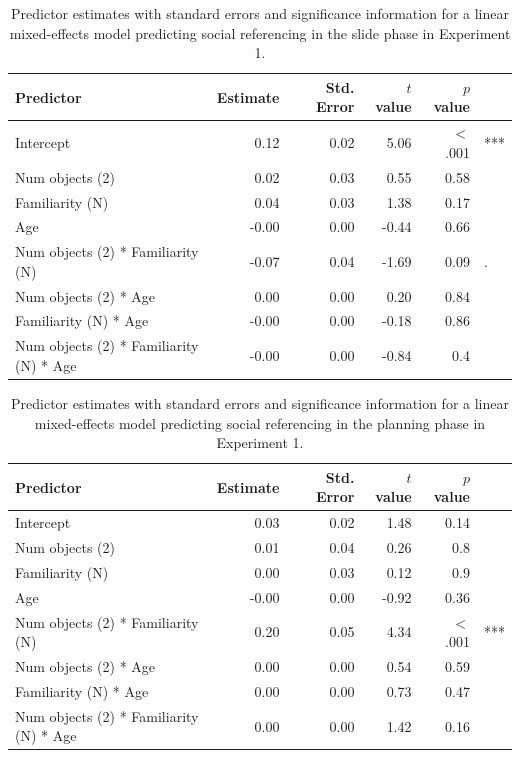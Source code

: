 \documentclass[a4paper,man,apacite,floatsintext]{apa6}
\begin{document}
\begin{table}[tb]
\centering
\begin{tabular}{lrrrrl}
 Predictor & Estimate & Std. Error & $t$ value & $p$ value &  \\ 
  \hline
Intercept & 0.12 & 0.02 & 5.06 & $<$ .001 & *** \\ 
  Num objects (2) & 0.02 & 0.03 & 0.55 & 0.58 &  \\ 
  Familiarity (N) & 0.04 & 0.03 & 1.38 & 0.17 &  \\ 
  Age & -0.00 & 0.00 & -0.44 & 0.66 &  \\ 
  Num objects (2) * Familiarity (N) & -0.07 & 0.04 & -1.69 & 0.09 & . \\ 
  Num objects (2) * Age & 0.00 & 0.00 & 0.20 & 0.84 &  \\ 
  Familiarity (N) * Age & -0.00 & 0.00 & -0.18 & 0.86 &  \\ 
  Num objects (2) * Familiarity (N) * Age & -0.00 & 0.00 & -0.84 & 0.4 &  \\ 
   \hline
\end{tabular}
\caption{Predictor estimates with standard errors and significance information for a linear mixed-effects model predicting social referencing in the slide phase in Experiment 1.} 
\label{tab:exp1_s_reg}
\end{table}

\begin{table}[tb]
\centering
\begin{tabular}{lrrrrl}
 Predictor & Estimate & Std. Error & $t$ value & $p$ value &  \\ 
  \hline
Intercept & 0.03 & 0.02 & 1.48 & 0.14 &  \\ 
  Num objects (2) & 0.01 & 0.04 & 0.26 & 0.8 &  \\ 
  Familiarity (N) & 0.00 & 0.03 & 0.12 & 0.9 &  \\ 
  Age & -0.00 & 0.00 & -0.92 & 0.36 &  \\ 
  Num objects (2) * Familiarity (N) & 0.20 & 0.05 & 4.34 & $<$ .001 & *** \\ 
  Num objects (2) * Age & 0.00 & 0.00 & 0.54 & 0.59 &  \\ 
  Familiarity (N) * Age & 0.00 & 0.00 & 0.73 & 0.47 &  \\ 
  Num objects (2) * Familiarity (N) * Age & 0.00 & 0.00 & 1.42 & 0.16 &  \\ 
   \hline
\end{tabular}
\caption{Predictor estimates with standard errors and significance information for a linear mixed-effects model predicting social referencing in the planning phase in Experiment 1.} 
\label{tab:exp1_p_reg}
\end{table}
\end{document}
